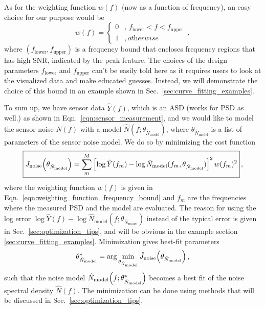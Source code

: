As for the weighting function $w(f)$ (now as a function of frequency), an easy choice for our purpose would be
\begin{equation}
	w(f)=
	\begin{cases}
		0 &,\, f_\mathrm{lower}<f<f_\mathrm{upper} \\
		1 &,\, \textit{otherwise}
	\end{cases}
	\,,
	\label{eqn:weighting_function_frequency_bound}
\end{equation}
where $\left(f_\mathrm{lower},f_\mathrm{upper}\right)$ is a frequency bound that encloses frequency regions that has high SNR, indicated by the peak feature.
The choices of the design parameters $f_\mathrm{lower}$ and $f_\mathrm{upper}$ can't be easily told here as it requires users to look at the visualized data and make educated guesses.
Instead, we will demonstrate the choice of this bound in an example shown in Sec.~\ref{sec:curve_fitting_examples}.

To sum up, we have sensor data $\hat{Y}(f)$, which is an ASD (works for PSD as well.) as shown in Eqn.~\eqref{eqn:sensor_measurement}, and we would like to model the sensor noise $\hat{N}(f)$ with a model $\hat{N}(f;\theta_{\hat{N}_\mathrm{model}})$, where $\theta_{\hat{N}_\mathrm{model}}$ is a list of parameters of the sensor noise model.
We do so by minimizing the cost function
\begin{equation}
	\boxed{
		J_\mathrm{noise}\mleft(\theta_{\hat{N}_\mathrm{model}}\mright)=\sum_m^M\left[\log\hat{Y}(f_m)-\log\hat{N}_\mathrm{model}(f_m, \theta_{\hat{N}_\mathrm{model}})\right]^2 w(f_m)^2
	}\,,
	\label{eqn:noise_cost_function}
\end{equation}
where the weighting function $w(f)$ is given in Eqn.~\eqref{eqn:weighting_function_frequency_bound} and $f_m$ are the frequencies where the measured PSD and the model are evaluated.
The reason for using the log error $\log\hat{Y}(f) - \log\hat{N}_\mathrm{model}(f;\theta_{\hat{N}_\mathrm{model}})$ instead of the typical error is given in Sec.~\ref{sec:optimization_tips}, and will be obvious in the example section \ref{sec:curve_fitting_examples}.
Minimization gives best-fit parameters
\begin{equation}
	\theta_{\hat{N}_\mathrm{model}}^*=\arg\min_{\theta_{\hat{N}_\mathrm{model}}} \hat{J}_\mathrm{noise}\mleft(\theta_{\hat{N}_\mathrm{model}}\mright)\,,
\end{equation} such that the noise model $\hat{N}_\mathrm{model}\mleft(f;\theta_{\hat{N}_\mathrm{model}}^*\mright)$ becomes a best fit of the noise spectral density $\hat{N}(f)$.
The minimization can be done using methods that will be discussed in Sec.~\ref{sec:optimization_tips}.
